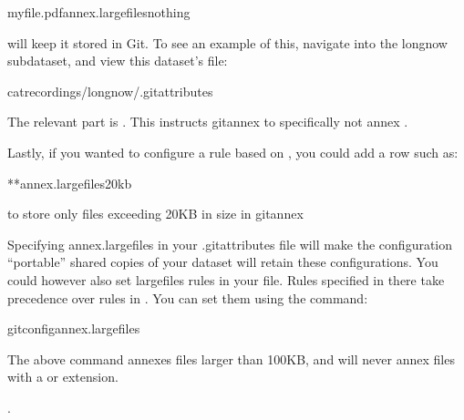 \begin{sphinxVerbatim}[commandchars=\\\{\}]
myfile.pdfannex.largefilesnothing
\end{sphinxVerbatim}

\sphinxAtStartPar
will keep it stored in Git. To see an example of this, navigate into the longnow subdataset,
and view this dataset’s  file:

\begin{sphinxVerbatim}[commandchars=\\\{\}]
catrecordings/longnow/.gitattributes
\end{sphinxVerbatim}

\sphinxAtStartPar
The relevant part is .
This instructs git\sphinxhyphen{}annex to specifically not annex .

\sphinxAtStartPar
Lastly, if you wanted to configure a rule based on , you could add a row such as:

\begin{sphinxVerbatim}[commandchars=\\\{\}]
**annex.largefiles20kb
\end{sphinxVerbatim}

\sphinxAtStartPar
to store only files exceeding 20KB in size in git\sphinxhyphen{}annex%
\begin{footnote}\sphinxAtStartFootnote
Specifying annex.largefiles in your .gitattributes file will make the configuration
“portable” \textendash{} shared copies of your dataset will retain these configurations.
You could however also set largefiles rules in your  file. Rules
specified in there take precedence over rules in . You can set
them using the  command:

\sphinxSetupCodeBlockInFootnote
\begin{sphinxVerbatim}[commandchars=\\\{\}]
gitconfigannex.largefiles
\end{sphinxVerbatim}

\sphinxAtStartPar
The above command annexes files larger than 100KB, and will never annex files with a
 or  extension.
%
\end{footnote}.

